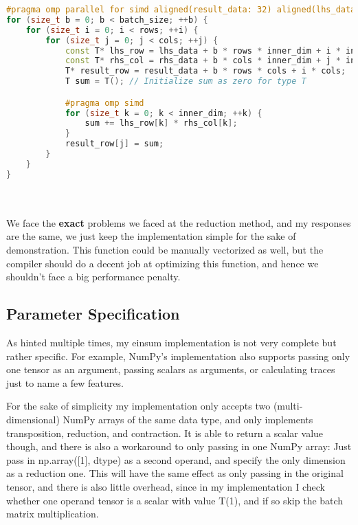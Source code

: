 \documentclass[sigconf]{acmart}
\renewcommand{\texttt}[1]{\begingroup\ttfamily\sloppy\hbadness=10000 #1\endgroup}
\begin{document}
\begin{lstlisting}[language=C++]
#pragma omp parallel for simd aligned(result_data: 32) aligned(lhs_data: 32) aligned(rhs_data: 32) collapse(3)
for (size_t b = 0; b < batch_size; ++b) {
    for (size_t i = 0; i < rows; ++i) {
        for (size_t j = 0; j < cols; ++j) {
            const T* lhs_row = lhs_data + b * rows * inner_dim + i * inner_dim;
            const T* rhs_col = rhs_data + b * cols * inner_dim + j * inner_dim;
            T* result_row = result_data + b * rows * cols + i * cols;
            T sum = T(); // Initialize sum as zero for type T

            #pragma omp simd
            for (size_t k = 0; k < inner_dim; ++k) {
                sum += lhs_row[k] * rhs_col[k];
            }
            result_row[j] = sum;
        }
    }
}
\end{lstlisting}
\\\\
We face the \textbf{exact} problems we faced at the reduction method, and my responses are the same, we just keep the implementation simple for the sake of demonstration. This function could be manually vectorized as well, but the compiler should do a decent job at optimizing this function, and hence we shouldn't face a big performance penalty.

\subsection{Parameter Specification}
As hinted multiple times, my einsum implementation is not very complete but rather specific. For example, NumPy's implementation also supports passing only one tensor as an argument, passing scalars as arguments, or calculating traces just to name a few features.

For the sake of simplicity my implementation only accepts two (multi-dimensional) NumPy arrays of the same data type, and only implements transposition, reduction, and contraction. It is able to return a scalar value though, and there is also a workaround to only passing in one NumPy array: Just pass in \texttt{np.array([1], dtype)} as a second operand, and specify the only dimension as a reduction one. This will have the same effect as only passing in the original tensor, and there is also little overhead, since in my implementation I check whether one operand tensor is a scalar with value \texttt{T(1)}, and if so skip the batch matrix multiplication.
\end{document}
